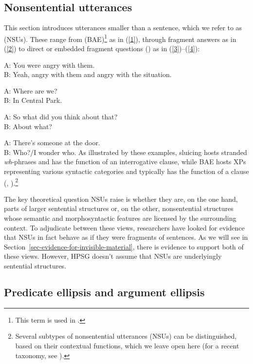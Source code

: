 \subsection{Nonsentential utterances}
This section introduces utterances smaller than a sentence, which we refer to as \emph{} (NSUs). These range from \emph{} (BAE)\footnote{This term is used in \citet{CJ2005a}.} as in (\ref{1}), through fragment answers as in (\ref{2})
to direct or embedded fragment questions () as in (\ref{3})--(\ref{4}):

\ea A: You were angry with them.\\ B: Yeah, angry with them and angry with the situation.\label{1}\z

\ea A: Where are we? \\B: In Central Park.\label{2}\z

\ea A: So what did you think about that?\\ B: About what? \label{3}\z

\ea A: There's someone at the door. \\B: Who?/I wonder who. \label{4}\z
%
As illustrated by these examples, sluicing hosts stranded \emph{wh}-phrases and has the function of an interrogative clause, while BAE hosts XPs representing various syntactic categories and typically has the function of a clause (\citealt[313]{Ginzburg:Sag:2000}, \citealt[233]{CJ2005a}).\footnote{Several subtypes of nonsentential utterances (NSUs) can be distinguished, based on their contextual functions, which we leave open here (for a recent taxonomy, see \citealt[217]{Ginzburg2012}).}

The key theoretical question NSUs raise is whether they are, on the one hand, parts of larger sentential structures or, on the other, nonsentential structures whose semantic and morphosyntactic features are licensed by the surrounding context. To adjudicate between these views, researchers have looked for evidence that NSUs in fact behave as if they were fragments of sentences. As we will see in Section~\ref{sec-evidence-for-invisible-material}, there is evidence to support both of these views. However, HPSG doesn't assume that NSUs are underlyingly sentential structures.

\subsection{Predicate ellipsis and argument ellipsis}
\label{ellipsis-sec-Predicate-ellipsis-and-argument-ellipsis}

